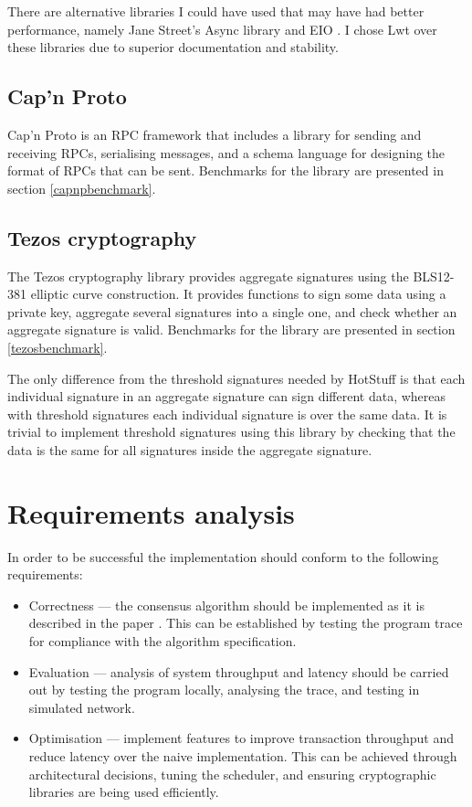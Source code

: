 There are alternative libraries I could have used that may have had better performance, namely Jane Street's Async library \cite{async} and EIO \cite{eio}. I chose Lwt over these libraries due to superior documentation and stability.

\subsection{Cap'n Proto}
Cap'n Proto  \cite{capnp} is an RPC framework that includes a library for sending and receiving RPCs, serialising messages, and a schema language for designing the format of RPCs that can be sent. Benchmarks for the library are presented in section \ref{capnpbenchmark}.

\subsection{Tezos cryptography} \label{tezos}
The Tezos cryptography library \cite{tezosCrypto} provides aggregate signatures using the BLS12-381 elliptic curve construction. It provides functions to sign some data using a private key, aggregate several signatures into a single one, and check whether an aggregate signature is valid. Benchmarks for the library are presented in section \ref{tezosbenchmark}.

The only difference from the threshold signatures needed by HotStuff is that each individual signature in an aggregate signature can sign different data, whereas with threshold signatures each individual signature is over the same data. It is trivial to implement threshold signatures using this library by checking that the data is the same for all signatures inside the aggregate signature.

\section{Requirements analysis} \label{requirements}

In order to be successful the implementation should conform to the following requirements:
\begin{itemize}
	\item Correctness --- the consensus algorithm should be implemented as it is described in the paper \cite{yinHotStuffBFTConsensus2019}. This can be established by testing the program trace for compliance with the algorithm specification.
	\item Evaluation --- analysis of system throughput and latency should be carried out by testing the program locally, analysing the trace, and testing in simulated network.
	\item Optimisation --- implement features to improve transaction throughput and reduce latency over the naive implementation. This can be achieved through architectural decisions, tuning the scheduler, and ensuring cryptographic libraries are being used efficiently.
\end{itemize}

